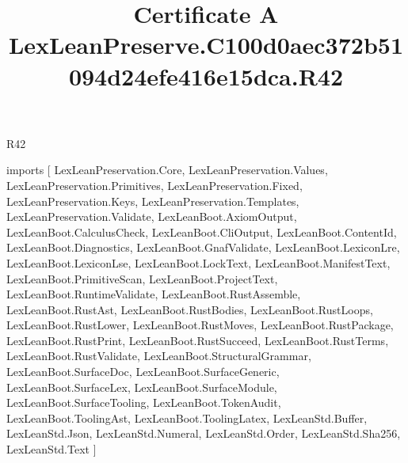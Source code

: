\begin{lexlean}{R42}
\title{Certificate A LexLeanPreserve.C100d0aec372b51094d24efe416e15dca.R42}
\begin{coremodule}
imports [
  LexLeanPreservation.Core,
  LexLeanPreservation.Values,
  LexLeanPreservation.Primitives,
  LexLeanPreservation.Fixed,
  LexLeanPreservation.Keys,
  LexLeanPreservation.Templates,
  LexLeanPreservation.Validate,
  LexLeanBoot.AxiomOutput,
  LexLeanBoot.CalculusCheck,
  LexLeanBoot.CliOutput,
  LexLeanBoot.ContentId,
  LexLeanBoot.Diagnostics,
  LexLeanBoot.GnafValidate,
  LexLeanBoot.LexiconLre,
  LexLeanBoot.LexiconLse,
  LexLeanBoot.LockText,
  LexLeanBoot.ManifestText,
  LexLeanBoot.PrimitiveScan,
  LexLeanBoot.ProjectText,
  LexLeanBoot.RuntimeValidate,
  LexLeanBoot.RustAssemble,
  LexLeanBoot.RustAst,
  LexLeanBoot.RustBodies,
  LexLeanBoot.RustLoops,
  LexLeanBoot.RustLower,
  LexLeanBoot.RustMoves,
  LexLeanBoot.RustPackage,
  LexLeanBoot.RustPrint,
  LexLeanBoot.RustSucceed,
  LexLeanBoot.RustTerms,
  LexLeanBoot.RustValidate,
  LexLeanBoot.StructuralGrammar,
  LexLeanBoot.SurfaceDoc,
  LexLeanBoot.SurfaceGeneric,
  LexLeanBoot.SurfaceLex,
  LexLeanBoot.SurfaceModule,
  LexLeanBoot.SurfaceTooling,
  LexLeanBoot.TokenAudit,
  LexLeanBoot.ToolingAst,
  LexLeanBoot.ToolingLatex,
  LexLeanStd.Buffer,
  LexLeanStd.Json,
  LexLeanStd.Numeral,
  LexLeanStd.Order,
  LexLeanStd.Sha256,
  LexLeanStd.Text
]


\end{coremodule}
\end{lexlean}
